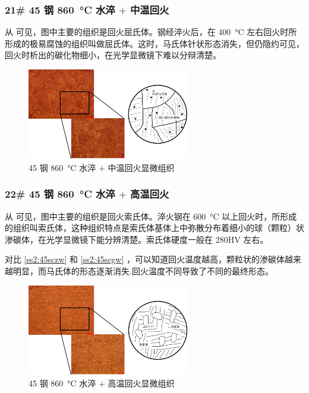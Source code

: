 \documentclass[a4paper,utf8]{article}
\begin{document}
        \subsubsection{21# 45 钢 \SI{860}{\degreeCelsius} 水淬 $+$ 中温回火\label{ss2:45sczw}}
            从 可见，图中主要的组织是回火屈氏体。钢经淬火后，在 \SI{400}{\degreeCelsius} 左右回火时所形成的极易腐蚀的组织叫做屈氏体。这时，马氏体针状形态消失，但仍隐约可见，回火时析出的碳化物细小，在光学显微镜下难以分辩清楚。
            \begin{figure}[!ht]
                \includegraphics[height=40mm]{result/8.pdf}
                \caption{45 钢 \SI{860}{\degreeCelsius} 水淬 $+$ 中温回火显微组织\label{fig:8}}
            \end{figure}

        \subsubsection{22# 45 钢 \SI{860}{\degreeCelsius} 水淬 $+$ 高温回火\label{ss2:45scgw}}
            从 可见，图中主要的组织是回火索氏体。淬火钢在 \SI{600}{\degreeCelsius} 以上回火时，所形成的组织叫索氏体，这种组织特点是索氏体基体上中弥散分布着细小的球（颗粒）状渗碳体，在光学显微镜下能分辨清楚。索氏体硬度一般在 280HV 左右。\par
            对比 \ref{ss2:45sczw} 和 \ref{ss2:45scgw} ，可以知道回火温度越高，颗粒状的渗碳体越来越明显，而马氏体的形态逐渐消失.回火温度不同导致了不同的最终形态。
            \begin{figure}[!ht]
                \includegraphics[height=40mm]{result/9.pdf}
                \caption{45 钢 \SI{860}{\degreeCelsius} 水淬 $+$ 高温回火显微组织\label{fig:9}}
            \end{figure}
\end{document}
